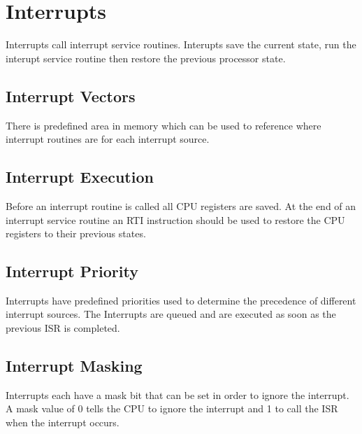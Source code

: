 \section{Interrupts}
	Interrupts call interrupt service routines.
	Interupts save the current state, run the interupt service routine then restore the previous processor state.

	\subsection{Interrupt Vectors}
		There is predefined area in memory which can be used to reference where interrupt routines are for each interrupt source.
	
	\subsection{Interrupt Execution}
		Before an interrupt routine is called all CPU registers are saved.
		At the end of an interrupt service routine an RTI instruction should be used to restore the CPU registers to their previous states.

	\subsection{Interrupt Priority}
		Interrupts have predefined priorities used to determine the precedence of different interrupt sources.
		The Interrupts are queued and are executed as soon as the previous ISR is completed.

	\subsection{Interrupt Masking}
		Interrupts each have a mask bit that can be set in order to ignore the interrupt.
		A mask value of 0 tells the CPU to ignore the interrupt and 1 to call the ISR when the interrupt occurs.

